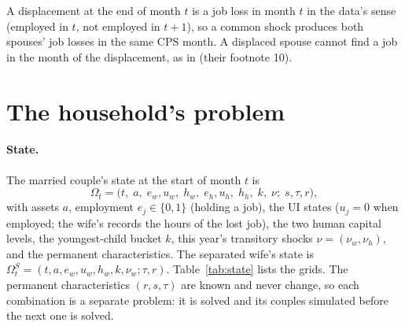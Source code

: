 \documentclass[11pt]{article}
\newcommand{\1}{\mathbf{1}}
\begin{document}
A displacement at the end of month $t$ is a job loss in month $t$ in the data's sense (employed in $t$, not employed in
$t+1$), so a common shock produces both spouses' job losses in the same CPS month. A displaced spouse cannot find a job
in the month of the displacement, as in \citet{bacher2025joint} (their footnote 10).

\section{The household's problem}\label{sec:problem}

\paragraph{State.} The married couple's state at the start of month $t$ is
\[
  \Omega_t = \big(t,\; a,\; e_w, u_w,\; h_w,\; e_h, u_h,\; h_h,\; k,\; \nu;\; s, \tau, r\big),
\]
with assets $a$, employment $e_j \in \{0, 1\}$ (holding a job), the UI states ($u_j = 0$ when employed; the wife's
records the hours of the lost job), the two human capital levels, the youngest-child bucket $k$, this year's transitory
shocks $\nu = (\nu_w, \nu_h)$, and the permanent characteristics. The separated wife's state is
$\Omega^S_t = (t, a, e_w, u_w, h_w, k, \nu_w; \tau, r)$. Table~\ref{tab:state} lists the grids. The permanent
characteristics $(r, s, \tau)$ are known and never change, so each combination is a separate problem: it is solved and
its couples simulated before the next one is solved.
\end{document}
